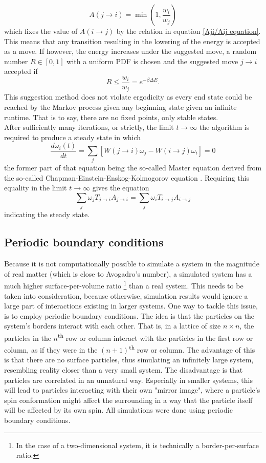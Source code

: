 \documentclass[10pt,a4paper]{article}
\begin{document}
\begin{equation}
A(j \rightarrow i) = \min \left( 1, \frac{w_i}{w_j} \right)
\end{equation}
which fixes the value of $A(i \rightarrow j)$ by the relation in equation \eqref{Aji/Aij equation}. This means that any transition resulting in the lowering of the energy is accepted as a move. If however, the energy increases under the suggested move, a random number $R \in [0,1]$ with a uniform PDF is chosen and the suggested move $j\rightarrow i$ accepted if
\begin{equation}
R \leq \frac{w_i}{w_j} =e^{-\beta \Delta E}.
\end{equation}
This suggestion method does not violate ergodicity as every end state could be reached by the Markov process given any beginning state given an infinite runtime. That is to say, there are no fixed points, only stable states.\\After sufficiently many iterations, or strictly, the limit $t\rightarrow \infty$ the algorithm is required to produce a steady state in which
\begin{equation}
\dfrac{d\omega_i(t)}{dt} = \sum_j \left[ W(j\rightarrow i)\omega_j - W(i\rightarrow j)\omega_i \right] = 0
\end{equation}
the former part of that equation being the so-called Master equation derived from the so-called Chapman-Einstein-Enskog-Kolmogorov equation \cite{Lecture_Notes_Fall_2015}. Requiring this equality in the limit $t\rightarrow \infty$ gives the equation
\begin{equation}
\sum_j \omega_jT_{j\rightarrow i}A_{j\rightarrow i} = \sum_j \omega_iT_{i\rightarrow j}A_{i\rightarrow j}
\end{equation}
indicating the steady state.
\subsection{Periodic boundary conditions}
Because it is not computationally possible to simulate a system in the magnitude of real matter (which is close to Avogadro's number), a simulated system has a much higher surface-per-volume ratio \footnote{In the case of a two-dimensional system, it is technically a border-per-surface ratio.} than a real system. This needs to be taken into consideration, because otherwise, simulation results would ignore a large part of interactions existing in larger systems. One way to tackle this issue, is to employ periodic boundary conditions. The idea is that the particles on the system's borders interact with each other. That is, in a lattice of size $n\times n$, the particles in the $n$\textsuperscript{th} row or column interact with the particles in the first row or column, as if they were in the  $(n+1)$\textsuperscript{th} row or column. The advantage of this is that there are no surface particles, thus simulating an infinitely large system, resembling reality closer than a very small system. The disadvantage is that particles are correlated in an unnatural way. Especially in smaller systems, this will lead to particles interacting with their own "mirror image", where a particle's spin conformation might affect the surrounding in a way that the particle itself will be affected by its own spin.
All simulations were done using periodic boundary conditions.
\end{document}
